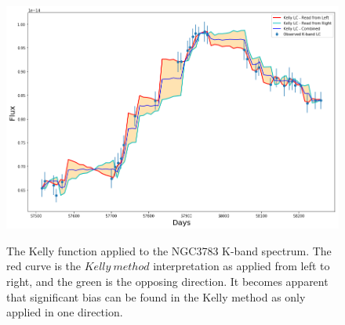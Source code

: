\documentclass[a4paper, 12pt, twoside]{article}
\begin{document}
\begin{figure}[t!]
\centering
\includegraphics[width=1\linewidth]{Figure/NGC3783K-Kelly.png}\\
\caption{The Kelly function applied to the NGC3783 K-band spectrum. The red curve is the $Kelly \ method$ interpretation as applied from left to right, and the green is the opposing direction. It becomes apparent that significant bias can be found in the Kelly method as only applied in one direction.}
\label{fig:NGC3783K-Kelly}
\end{figure}
\end{document}
